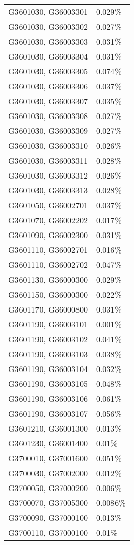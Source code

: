 \begin{longtable}[]{@{}ll@{}}
G3601030, G36003301 & 0.029\% \\
G3601030, G36003302 & 0.027\% \\
G3601030, G36003303 & 0.031\% \\
G3601030, G36003304 & 0.031\% \\
G3601030, G36003305 & 0.074\% \\
G3601030, G36003306 & 0.037\% \\
G3601030, G36003307 & 0.035\% \\
G3601030, G36003308 & 0.027\% \\
G3601030, G36003309 & 0.027\% \\
G3601030, G36003310 & 0.026\% \\
G3601030, G36003311 & 0.028\% \\
G3601030, G36003312 & 0.026\% \\
G3601030, G36003313 & 0.028\% \\
G3601050, G36002701 & 0.037\% \\
G3601070, G36002202 & 0.017\% \\
G3601090, G36002300 & 0.031\% \\
G3601110, G36002701 & 0.016\% \\
G3601110, G36002702 & 0.047\% \\
G3601130, G36000300 & 0.029\% \\
G3601150, G36000300 & 0.022\% \\
G3601170, G36000800 & 0.031\% \\
G3601190, G36003101 & 0.001\% \\
G3601190, G36003102 & 0.041\% \\
G3601190, G36003103 & 0.038\% \\
G3601190, G36003104 & 0.032\% \\
G3601190, G36003105 & 0.048\% \\
G3601190, G36003106 & 0.061\% \\
G3601190, G36003107 & 0.056\% \\
G3601210, G36001300 & 0.013\% \\
G3601230, G36001400 & 0.01\% \\
G3700010, G37001600 & 0.051\% \\
G3700030, G37002000 & 0.012\% \\
G3700050, G37000200 & 0.006\% \\
G3700070, G37005300 & 0.0086\% \\
G3700090, G37000100 & 0.013\% \\
G3700110, G37000100 & 0.01\% \\

\end{longtable}
